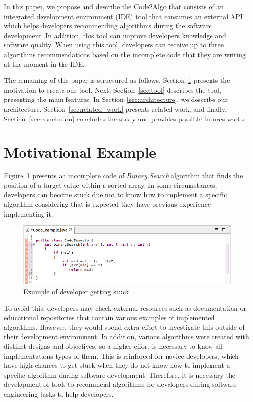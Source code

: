 \documentclass[12pt]{article}
\begin{document}
    In this paper, we propose and describe the Code2Algo that consists of an integrated development environment (IDE) tool that consumes an external API which helps developers recommending algorithms during the software development. In addition, this tool can improve developers knowledge and software quality. When using this tool, developers can receive up to three algorithms recommendations based on the incomplete code that they are writing at the moment in the IDE.
    
    The remaining of this paper is structured as follows. Section~\ref{sec:mot} presents the motivation to create our tool. Next, Section~\ref{sec:tool} describes the tool, presenting the main features. In Section~\ref{sec:architecture}, we describe our architecture. Section~\ref{sec:related_work} presents related work, and finally, Section~\ref{sec:conclusion} concludes the study and provides possible futures works.


\section{Motivational Example}
\label{sec:mot}
    
    
    Figure~\ref{fig:binary} presents an incomplete code of \textit{Binary Search} algorithm that finds the position of a target value within a sorted array. In some circumstances, developers can become stuck due not to know how to implement a specific algorithm considering that is expected they have previous experience implementing it.
    
    \begin{figure}[h]
        \centering
        \includegraphics[width=\linewidth]{cbsoft19/figs/binary.png}
        \caption{Example of developer getting stuck}
        \label{fig:binary}
    \end{figure}
    
     To avoid this, developers may check external resources such as documentation or educational repositories that contain various examples of implemented algorithms. However, they would spend extra effort to investigate this outside of their development environment. In addition, various algorithms were created with distinct designs and objectives, so a higher effort is necessary to know all implementations types of them. This is reinforced for novice developers, which have high chances to get stuck when they do not know how to implement a specific algorithm during software development. Therefore, it is necessary the development of tools to recommend algorithms for developers during software engineering tasks to help developers. 
    
\end{document}

